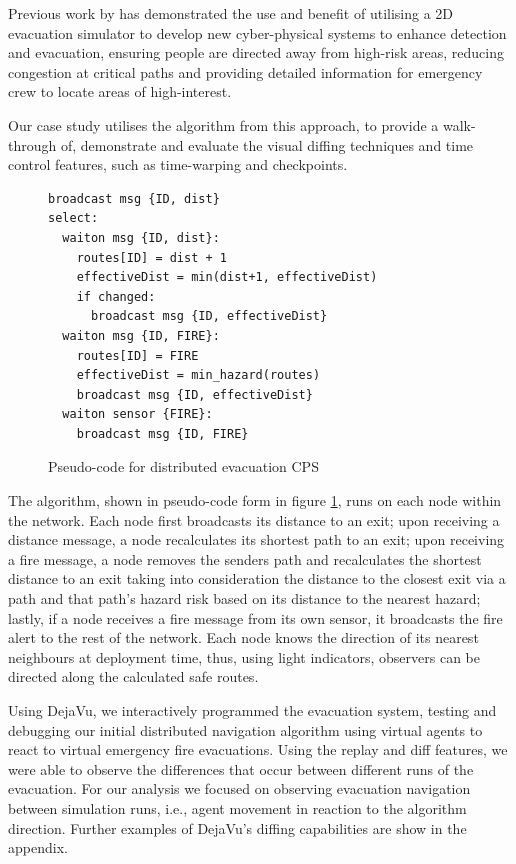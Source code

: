 Previous work by \cite{doi:10.1093/comjnl/bxq012,7152824} has demonstrated the use and benefit of utilising a 2D evacuation simulator to develop new cyber-physical systems to enhance detection and evacuation, ensuring people are directed away from high-risk areas, reducing congestion at critical paths and providing detailed information for emergency crew to locate areas of high-interest. 

Our case study utilises the algorithm from this approach, to provide a walk-through of, demonstrate and evaluate the visual diffing techniques and time control features, such as time-warping and checkpoints.

\begin{figure}[bht]
\begin{lstlisting}[style=CPSCAL]
broadcast msg {ID, dist}
select:
  waiton msg {ID, dist}:
    routes[ID] = dist + 1
    effectiveDist = min(dist+1, effectiveDist)
    if changed:
      broadcast msg {ID, effectiveDist}
  waiton msg {ID, FIRE}:
    routes[ID] = FIRE
    effectiveDist = min_hazard(routes)
    broadcast msg {ID, effectiveDist}
  waiton sensor {FIRE}:
    broadcast msg {ID, FIRE}
\end{lstlisting}
\caption{Pseudo-code for distributed evacuation CPS}
\label{code:algo}
\end{figure}

The algorithm, shown in pseudo-code form in figure \ref{code:algo}, runs on each node within the network. Each node first broadcasts its distance to an exit; upon receiving a distance message, a node recalculates its shortest path to an exit; upon receiving a fire message, a node removes the senders path and recalculates the shortest distance to an exit taking into consideration the distance to the closest exit via a path and that path's hazard risk based on its distance to the nearest hazard; lastly, if a node receives a fire message from its own sensor, it broadcasts the fire alert to the rest of the network. Each node knows the direction of its nearest neighbours at deployment time, thus, using light indicators, observers can be directed along the calculated safe routes.

Using DejaVu, we interactively programmed the evacuation system, testing and debugging our initial distributed navigation algorithm using virtual agents to react to virtual emergency fire evacuations.
Using the replay and diff features, we were able to observe the differences that occur between different runs of the evacuation. For our analysis we focused on observing evacuation navigation between simulation runs, i.e., agent movement in reaction to the algorithm direction. Further examples of DejaVu's diffing capabilities are show in the appendix.

